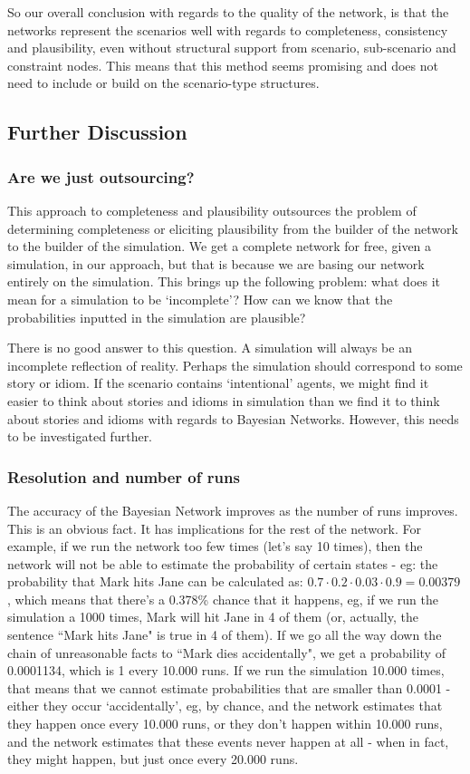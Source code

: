 So our overall conclusion with regards to the quality of the network, is that the networks represent the scenarios well with regards to completeness, consistency and plausibility, even without structural support from scenario, sub-scenario and constraint nodes. This means that this method seems promising and does not need to include or build on the scenario-type structures.

\subsection{Further Discussion}


\subsubsection{Are we just outsourcing?}

This approach to completeness and plausibility outsources the problem of determining completeness or eliciting plausibility from the builder of the network to the builder of the simulation. We get a complete network for free, given a simulation, in our approach, but that is because we are basing our network entirely on the simulation. This brings up the following problem: what does it mean for a simulation to be `incomplete'? How can we know that the probabilities inputted in the simulation are plausible?

 There is no good answer to this question. A simulation will always be an incomplete reflection of reality. Perhaps the simulation should correspond to some story or idiom. If the scenario contains `intentional' agents, we might find it easier to think about stories and idioms in simulation than we find it to think about stories and idioms with regards to Bayesian Networks. However, this needs to be investigated further.
 


\subsubsection{Resolution and number of runs}
The accuracy of the Bayesian Network improves as the number of runs improves. This is an obvious fact. It has implications for the rest of the network. For example, if we run the network too few times (let's say 10 times), then the network will not be able to estimate the probability of certain states - eg: the probability that Mark hits Jane can be calculated as: $0.7 \cdot 0.2 \cdot 0.03 \cdot 0.9 = 0.00379$, which means that there's a 0.378\% chance that it happens, eg, if we run the simulation a 1000 times, Mark will hit Jane in 4 of them (or, actually, the sentence ``Mark hits Jane" is true in 4 of them). If we go all the way down the chain of unreasonable facts to ``Mark dies accidentally", we get a probability of 0.0001134, which is 1 every 10.000 runs. If we run the simulation 10.000 times, that means that we cannot estimate probabilities that are smaller than 0.0001 - either they occur `accidentally', eg, by chance, and the network estimates that they happen once every 10.000 runs, or they don't happen within 10.000 runs, and the network estimates that these events never happen at all - when in fact, they might happen, but just once every 20.000 runs.

